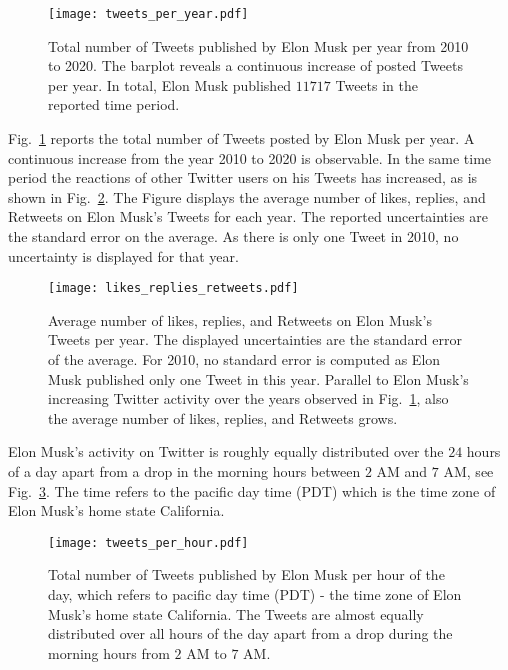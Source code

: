 \begin{figure}[h!]
\centering
\texttt{[image: tweets\_per\_year.pdf]}
\caption{Total number of Tweets published by Elon Musk per year from 2010 to 2020. The barplot reveals a continuous increase of posted Tweets per year. In total, Elon Musk published $11717$ Tweets in the reported time period.}
\label{fig:tweets_per_year}
\end{figure}

Fig.~\ref{fig:tweets_per_year} reports the total number of Tweets posted by Elon Musk per year. A continuous increase from the year 2010 to 2020 is observable. In the same time period the reactions of other Twitter users on his Tweets has increased, as is shown in Fig.~\ref{fig:likes_replies_retweets}. The Figure displays the average number of likes, replies, and Retweets on Elon Musk's Tweets for each year. The reported uncertainties are the standard error on the average. As there is only one Tweet in 2010, no uncertainty is displayed for that year.

\begin{figure}[h!]
\centering
\texttt{[image: likes\_replies\_retweets.pdf]}
\caption{Average number of likes, replies, and Retweets on Elon Musk's Tweets per year. The displayed uncertainties are the standard error of the average. For 2010, no standard error is computed as Elon Musk published only one Tweet in this year. Parallel to Elon Musk's increasing Twitter activity over the years observed in Fig.~\ref{fig:tweets_per_year}, also the average number of likes, replies, and Retweets grows.}
\label{fig:likes_replies_retweets}
\end{figure}

Elon Musk's activity on Twitter is roughly equally distributed over the $24$ hours of a day apart from a drop in the morning hours between $2$ AM and $7$ AM, see Fig.~\ref{fig:tweets_per_hour}. The time refers to the pacific day time (PDT) which is the time zone of Elon Musk's home state California. 

\begin{figure}[h!]
\centering
\texttt{[image: tweets\_per\_hour.pdf]}
\caption{Total number of Tweets published by Elon Musk per hour of the day, which refers to pacific day time (PDT) - the time zone of Elon Musk's home state California. The Tweets are almost equally distributed over all hours of the day apart from a drop during the morning hours from $2$ AM to $7$ AM.}
\label{fig:tweets_per_hour}
\end{figure}


